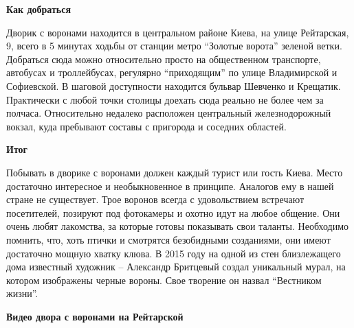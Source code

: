 \textbf{Как добраться} 

Дворик с воронами находится в центральном районе Киева, на улице Рейтарская, 9,
всего в 5 минутах ходьбы от станции метро \enquote{Золотые ворота} зеленой ветки.
Добраться сюда можно относительно просто на общественном транспорте, автобусах
и троллейбусах, регулярно \enquote{приходящим} по улице Владимирской и Софиевской. В
шаговой доступности находится бульвар Шевченко и Крещатик. Практически с любой
точки столицы доехать сюда реально не более чем за полчаса. Относительно
недалеко расположен центральный железнодорожный вокзал, куда пребывают составы
с пригорода и соседних областей.

\textbf{Итог}

Побывать в дворике с воронами должен каждый турист или гость Киева. Место
достаточно интересное и необыкновенное в принципе. Аналогов ему в нашей стране
не существует. Трое воронов всегда с удовольствием встречают посетителей,
позируют под фотокамеры и охотно идут на любое общение. Они очень любят
лакомства, за которые готовы показывать свои таланты. Необходимо помнить, что,
хоть птички и смотрятся безобидными созданиями, они имеют достаточно мощную
хватку клюва. В 2015 году на одной из стен близлежащего дома известный художник
– Александр Бритцевый создал уникальный мурал, на котором изображены черные
вороны. Свое творение он назвал \enquote{Вестником жизни}.

\textbf{Видео двора с воронами на Рейтарской}
